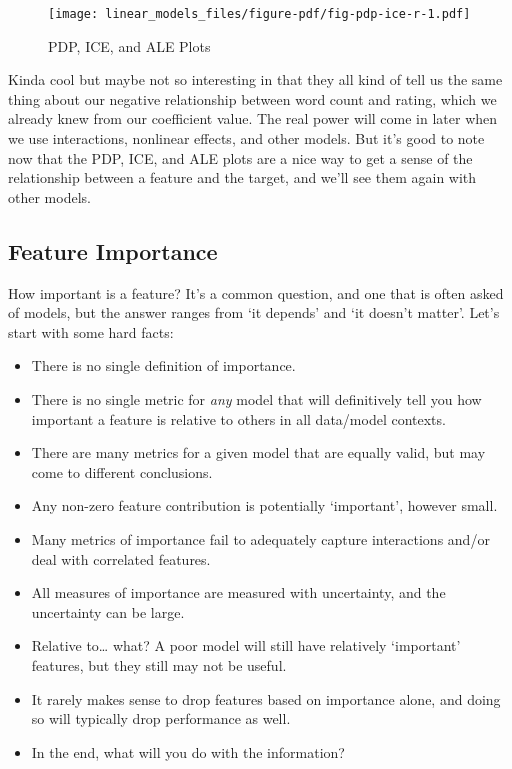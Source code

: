 \documentclass[
  letterpaper,
]{krantz}
\providecommand{\tightlist}{%
  \setlength{\itemsep}{0pt}\setlength{\parskip}{0pt}}\usepackage{longtable,booktabs,array}
\begin{document}
\begin{figure}

{\centering \texttt{[image: linear\_models\_files/figure-pdf/fig-pdp-ice-r-1.pdf]}

}

\caption{\label{fig-pdp-ice-r}PDP, ICE, and ALE Plots}

\end{figure}

Kinda cool but maybe not so interesting in that they all kind of tell us
the same thing about our negative relationship between word count and
rating, which we already knew from our coefficient value. The real power
will come in later when we use interactions, nonlinear effects, and
other models. But it's good to note now that the PDP, ICE, and ALE plots
are a nice way to get a sense of the relationship between a feature and
the target, and we'll see them again with other models.

\subsection{Feature Importance}\label{sec-lm-feature-importance}

How important is a feature? It's a common question, and one that is
often asked of models, but the answer ranges from `it depends' and `it
doesn't matter'. Let's start with some hard facts:

\begin{itemize}
\tightlist
\item
  There is no single definition of importance.
\item
  There is no single metric for \emph{any} model that will definitively
  tell you how important a feature is relative to others in all
  data/model contexts.
\item
  There are many metrics for a given model that are equally valid, but
  may come to different conclusions.
\item
  Any non-zero feature contribution is potentially `important', however
  small.
\item
  Many metrics of importance fail to adequately capture interactions
  and/or deal with correlated features.
\item
  All measures of importance are measured with uncertainty, and the
  uncertainty can be large.
\item
  Relative to\ldots{} what? A poor model will still have relatively
  `important' features, but they still may not be useful.
\item
  It rarely makes sense to drop features based on importance alone, and
  doing so will typically drop performance as well.
\item
  In the end, what will you do with the information?
\end{itemize}
\end{document}
